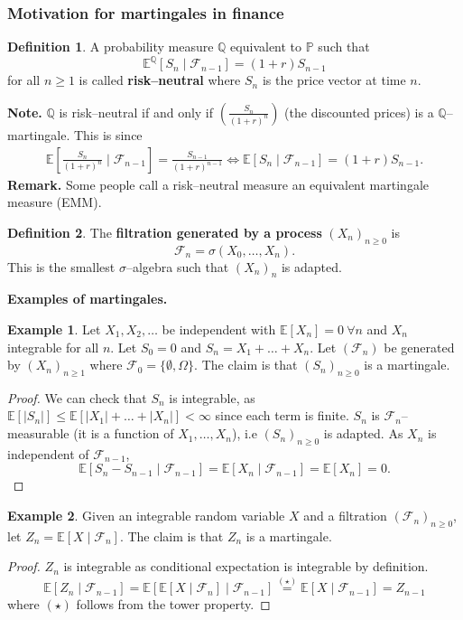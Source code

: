 \documentclass{article}
\theoremstyle{definition}
\newtheorem{example}{Example}[section]
\newtheorem{defn}{Definition}[section]
\begin{document}
\subsubsection{Motivation for martingales in finance}
\begin{defn}
    A probability measure $\mathbb{Q}$ equivalent to $\mathbb{P}$ such that \[
    \mathbb{E}^{\mathbb{Q}}[S_n \mid \mathcal{F}_{n-1}] = (1+r)S_{n-1}
    \] for all $n\ge 1$ is called \textbf{risk--neutral} where $S_n$ is the price vector at time $n$.
\end{defn}
\textbf{Note.} $\mathbb{Q}$ is risk--neutral if and only if $\left(\frac{S_n}{(1+r)^n}\right)$ (the discounted prices) is a $\mathbb{Q}$--martingale. This is since 
\begin{align*}
    \mathbb{E}\left[\frac{S_n}{(1+r)^n} \mid \mathcal{F}_{n-1}\right] = \frac{S_{n-1}}{(1+r)^{n-1}} \iff \mathbb{E}[S_n \mid \mathcal{F}_{n-1}] = (1+r)S_{n-1}.
\end{align*}
\textbf{Remark.} Some people call a risk--neutral measure an equivalent martingale measure (EMM).
\begin{defn}
    The \textbf{filtration generated by a process}  $(X_n)_{n\ge 0}$ is $$\mathcal{F}_n = \sigma(X_0,\ldots,X_n).$$
    This is the smallest $\sigma$--algebra such that $(X_n)_n$ is adapted.
\end{defn}

\textbf{Examples of martingales.}

\begin{example}
    Let $X_1,X_2,\ldots$ be independent with $\mathbb{E}[X_n]=0 ~\forall n$ and $X_n$ integrable for all $n$. Let $S_0=0$ and $S_n = X_1 + \ldots + X_n$. Let $(\mathcal{F}_n)$ be generated by $(X_n)_{n\ge 1}$ where $\mathcal{F}_0 = \{\emptyset, \Omega\}$. The claim is that $(S_n)_{n\ge 0}$ is a martingale.
\end{example}
\begin{proof}
    We can check that $S_n$ is integrable, as $\mathbb{E}[|S_n|]\le \mathbb{E}[|X_1| + \ldots + |X_n|] < \infty$ since each term is finite. $S_n$ is $\mathcal{F}_n$--measurable (it is a function of $X_1,\ldots,X_n$), i.e $(S_n)_{n\ge 0}$ is adapted. As $X_n$ is independent of $\mathcal{F}_{n-1}$,
    \[
    \mathbb{E}[S_n - S_{n-1} \mid \mathcal{F}_{n-1}] = \mathbb{E}[X_n \mid \mathcal{F}_{n-1}] = \mathbb{E}[X_n] = 0.
    \] 
\end{proof}
\begin{example}
    Given an integrable random variable $X$ and a filtration $(\mathcal{F}_n)_{n\ge 0}$, let $Z_n = \mathbb{E}[X \mid \mathcal{F}_n]$. The claim is that $Z_n$ is a martingale.
\end{example}
\begin{proof}
    $Z_n$ is integrable as conditional expectation is integrable by definition.
    \[
    \mathbb{E}[Z_n \mid \mathcal{F}_{n-1}] = \mathbb{E}[\mathbb{E}[X \mid \mathcal{F}_n] \mid \mathcal{F}_{n-1}] \stackrel{(\star)}{=}  \mathbb{E}[X \mid \mathcal{F}_{n-1}] = Z_{n-1}
    \]
    where $(\star)$ follows from the tower property.
\end{proof}
\end{document}
